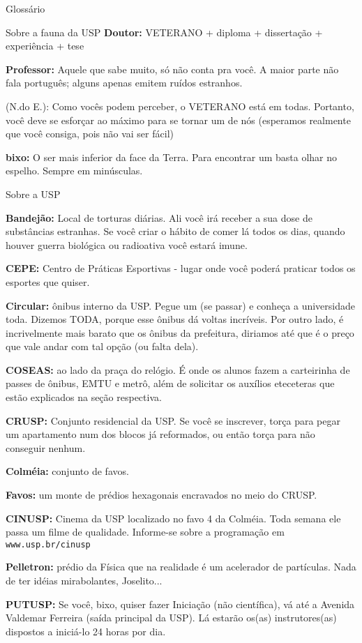 \begin{secao}{Glossário}
\begin{subsecao}{Sobre a fauna da USP}
{\bf Doutor:} VETERANO + diploma + dissertação + experiência + tese

{\bf Professor:} Aquele que sabe muito, só não conta pra você. A maior parte
não fala português; alguns apenas emitem ruídos estranhos.

(N.do E.): Como vocês podem perceber, o VETERANO está em todas. Portanto, você
deve se esforçar ao máximo para se tornar um de nós (esperamos realmente que
você consiga, pois não vai ser fácil)

{\bf bixo:} O ser mais inferior da face da Terra. Para encontrar um basta olhar
no espelho. Sempre em minúsculas.
\end{subsecao}

\begin{subsecao}{Sobre a USP}

{\bf Bandejão:} Local de torturas diárias. Ali você irá receber a sua dose de
substâncias estranhas. Se você criar o hábito de comer lá todos os dias, quando
houver guerra biológica ou radioativa você estará imune.

{\bf CEPE:} Centro de Práticas Esportivas - lugar onde você poderá praticar
todos os esportes que quiser.

{\bf Circular:} ônibus interno da USP. Pegue um (se passar) e conheça a
universidade toda. Dizemos TODA, porque esse ônibus dá voltas incríveis. Por
outro lado, é incrivelmente mais barato que os ônibus da prefeitura, diriamos
até que é o preço que vale andar com tal opção (ou falta dela).

{\bf COSEAS:} ao lado da praça do relógio. É onde os alunos fazem a carteirinha
de passes de ônibus, EMTU e metrô, além de solicitar os auxílios eteceteras que
estão explicados na seção respectiva.

{\bf CRUSP:} Conjunto residencial da USP. Se você se inscrever, torça para
pegar um apartamento num dos blocos já reformados, ou então torça para não
conseguir nenhum.

{\bf Colméia:} conjunto de favos.

{\bf Favos:} um monte de prédios hexagonais encravados no meio do CRUSP.

{\bf CINUSP:} Cinema da USP localizado no favo 4 da Colméia. Toda semana ele
passa um filme de qualidade. Informe-se sobre a programação em {\tt www.usp.br/cinusp}

{\bf Pelletron:} prédio da Física que na realidade é um acelerador de
partículas. Nada de ter idéias mirabolantes, Joselito...

{\bf PUTUSP:} Se você, bixo, quiser fazer Iniciação (não científica), vá até a
Avenida Valdemar Ferreira (saída principal da USP). Lá estarão os(as)
instrutores(as) dispostos a iniciá-lo 24 horas por dia.


\end{subsecao}
\end{secao}
